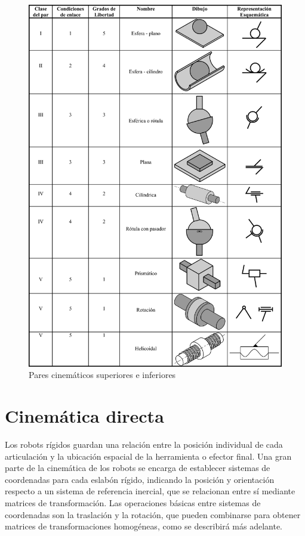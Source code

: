 \begin{figure}
	\centering
	\includegraphics[scale=1.0]{Capitulo2/figs/pares.png} 
	\caption{Pares cinemáticos superiores e inferiores}
	\label{pares}
\end{figure}

\section{Cinemática directa}

Los robots rígidos guardan una relación entre la posición individual de cada articulación y la ubicación espacial de la herramienta o efector final. Una gran parte de la cinemática de los robots se encarga de establecer sistemas de coordenadas para cada eslabón rígido, indicando la posición y orientación respecto a un sistema de referencia inercial, que se relacionan entre sí mediante matrices de transformación. Las operaciones básicas entre sistemas de coordenadas son la traslación y la rotación, que pueden combinarse para obtener matrices de transformaciones homogéneas, como se describirá más adelante. \\\\


